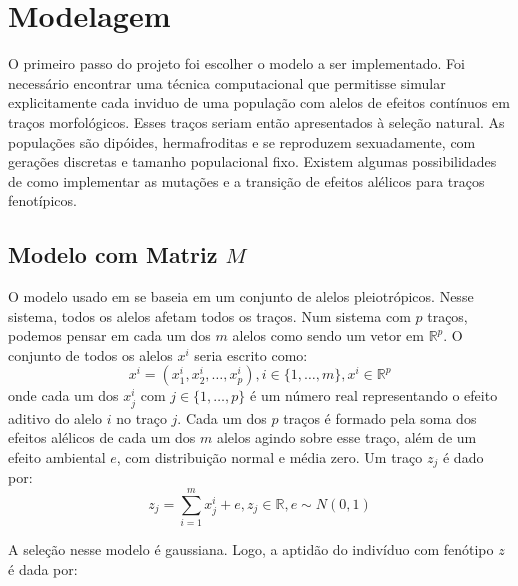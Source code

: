 \documentclass[a4paper, 12pt, titlepage, onecolumn]{article}
\numberwithin{equation}{section}
\numberwithin{table}{section}
\begin{document}
\section{Modelagem}

O primeiro passo do projeto foi escolher o modelo a ser implementado.
Foi necessário encontrar uma técnica computacional que permitisse
simular explicitamente cada inviduo de uma população com alelos de efeitos
contínuos em traços morfológicos. Esses traços seriam então apresentados
à seleção natural. As populações são dipóides, hermafroditas e se
reproduzem sexuadamente, com gerações discretas e tamanho populacional
fixo. Existem algumas possibilidades de como implementar as mutações e
a transição de efeitos alélicos para traços fenotípicos.

\subsection{Modelo com Matriz $M$} 
\label{ModelM}

O modelo usado em \cite{Jones2003, Jones2004, Jones2007} se baseia em um
conjunto de alelos pleiotrópicos. Nesse sistema, todos os alelos afetam
todos os traços. Num sistema com $p$ traços, podemos pensar em cada um
dos $m$ alelos como sendo um vetor em $\mathbb{R}^p$. O conjunto de todos os alelos $x^i$ seria
escrito como:
\begin{equation}
x^i = ( x^i_1, x^i_2,\ldots, x^i_p), i \in \{1,\ldots, m\}, x^i \in \mathbb{R}^p
\end{equation}
onde cada um dos $x^i_j$ com $j \in \{1,\ldots, p\}$ é um número real
representando o efeito aditivo do alelo $i$ no traço $j$. Cada um dos
$p$ traços é formado pela soma dos efeitos alélicos de cada um dos
$m$ alelos agindo sobre esse traço, além de um efeito ambiental $e$, com
distribuição normal e média zero. Um traço $z_j$ é dado
por:
\begin{equation}
z_j = \sum_{i=1}^m x^i_j + e, z_j \in \mathbb{R}, e \sim N(0, 1)
\end{equation}

A seleção nesse modelo é gaussiana. Logo, a aptidão do indivíduo com
fenótipo $z$ é dada por:
\end{document}
